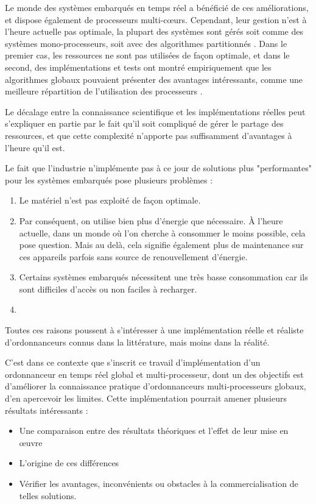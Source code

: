 \documentclass[11pt,a4paper,oneside]{report}
\begin{document}
	Le monde des systèmes embarqués en temps réel a bénéficié de ces améliorations, 
	et dispose également de processeurs multi-c\oe{}urs. Cependant, leur gestion n'est 
	à l'heure actuelle pas optimale, la plupart des systèmes sont  
	gérés soit comme des systèmes mono-processeurs, soit avec des algorithmes partitionnés \cite{paolillo_new_nodate}. 
	Dans le premier cas, les ressources ne sont pas utilisées de façon optimale, 
	et dans le second, des implémentations et tests ont montré empiriquement 
	que les algorithmes globaux pouvaient présenter des avantages intéressants, comme 
	une meilleure répartition de l'utilisation des processeurs \cite{baker_analysis_2005}. 
	\medskip
	
	Le décalage entre la connaissance scientifique et les implémentations réelles 
	peut s'expliquer en partie par le fait qu'il soit compliqué de gérer le partage des ressources, 
	et que cette complexité n'apporte pas suffisamment d'avantages à l'heure qu'il est.\medskip
	
	Le fait que l'industrie n'implémente pas à ce jour de solutions plus "performantes" 
	pour les systèmes embarqués pose plusieurs problèmes :
	\begin{enumerate}
		\item Le matériel n'est pas exploité de façon optimale.
		\item Par conséquent, on utilise bien plus d'énergie que nécessaire. 
		À l'heure actuelle, dans un monde où l'on cherche à consommer le moins possible, 
		cela pose question. Mais au delà, cela signifie également plus de maintenance 
		sur ces appareils parfois sans source de renouvellement d'énergie.
		\item Certains systèmes embarqués nécessitent une très basse consommation car 
		ils sont difficiles d'accès ou non faciles à recharger.
		\item 
	\end{enumerate}
	
	Toutes ces raisons poussent à s'intéresser à une implémentation réelle et réaliste 
	d'ordonnanceurs connus dans la littérature, mais moins dans la réalité.
	
	C'est dans ce contexte que s'inscrit ce travail d'implémentation d'un ordonnanceur en temps réel 
	global et multi-processeur, dont un des objectifs est d'améliorer la connaissance pratique 
	d'ordonnanceurs multi-processeurs globaux, d'en apercevoir les limites. 
	Cette implémentation pourrait amener plusieurs résultats intéressants : \medskip
	\begin{itemize}
		\item Une comparaison entre des résultats théoriques et l'effet de leur mise 
		en \oe{}uvre
		\item L'origine de ces différences
		\item Vérifier les avantages, inconvénients ou obstacles à la 
		commercialisation de telles solutions.
	\end{itemize}
	
\end{document}
